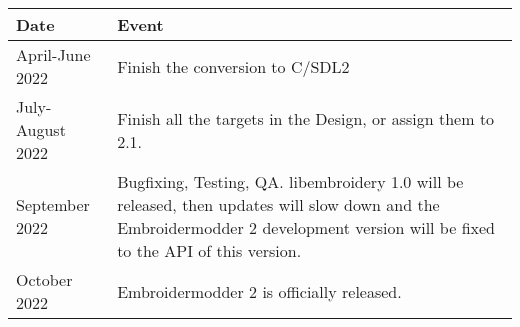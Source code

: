 
\begin{longtable}{l p{8cm}}
\textbf{Date} & \textbf{Event} \\
\hline
April-June 2022 & Finish the conversion to C/SDL2 \\
July-August 2022 & Finish all the targets in the Design, or assign them to 2.1. \\
September 2022 & Bugfixing, Testing, QA. libembroidery 1.0 will be released, then updates will slow down and the Embroidermodder 2 development version will be fixed to the API of this version. \\
October 2022 & Embroidermodder 2 is officially released.
\end{longtable}
